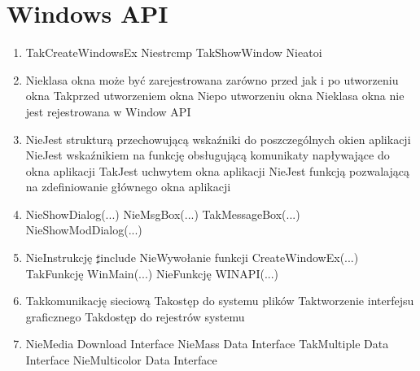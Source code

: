 


\newpage
\section{Windows API}

\begin{enumerate}
	
	\item {}
	{Tak}{CreateWindowsEx}
	{Nie}{strcmp}
	{Tak}{ShowWindow}
	{Nie}{atoi}
	
	\item {}
	{Nie}{klasa okna może być zarejestrowana zarówno przed jak i po utworzeniu okna}
	{Tak}{przed utworzeniem okna}
	{Nie}{po utworzeniu okna}
	{Nie}{klasa okna nie jest rejestrowana w Window API}
	
	\item {}
	{Nie}{Jest strukturą przechowującą wskaźniki do poszczególnych okien aplikacji}
	{Nie}{Jest wskaźnikiem na funkcję obsługującą komunikaty napływające do okna aplikacji}
	{Tak}{Jest uchwytem okna aplikacji}
	{Nie}{Jest funkcją pozwalającą na zdefiniowanie głównego okna aplikacji}
	
	\item {}
	{Nie}{ShowDialog(...)}
	{Nie}{MsgBox(...)}
	{Tak}{MessageBox(...)}
	{Nie}{ShowModDialog(...)}
	
	\item {}
	{Nie}{Instrukcję $\sharp$include}
	{Nie}{Wywołanie funkcji CreateWindowEx(...)}
	{Tak}{Funkcję WinMain(...)}
	{Nie}{Funkcję WINAPI(...)}
	
	\item {}
	{Tak}{komunikację sieciową}
	{Tak}{ostęp do systemu plików}
	{Tak}{tworzenie interfejsu graficznego}
	{Tak}{dostęp do rejestrów systemu}

	\item {}
	{Nie}{Media Download Interface}
	{Nie}{Mass Data Interface}
	{Tak}{Multiple Data Interface}
	{Nie}{Multicolor Data Interface}


\end{enumerate}
